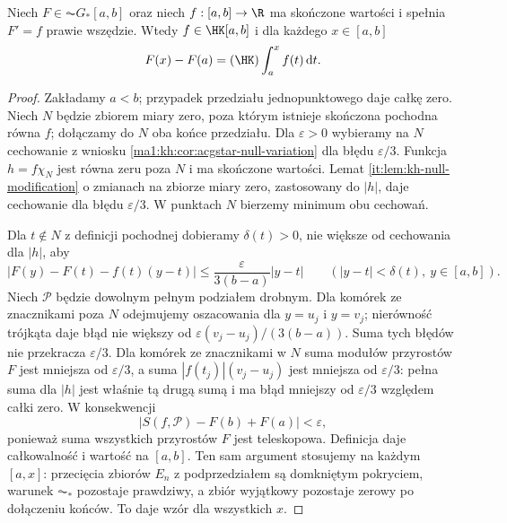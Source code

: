 \begin{twierdzenie}
\label{ma1:kh:thm:acgstar-derivative-integrable}\label{it:thm:acgstar-derivative-integrable}
Niech $F\in\AC G_*[a,b]$ oraz niech $f:[a,b]\to\R$ ma skończone wartości i spełnia $F'=f$ prawie wszędzie. Wtedy $f\in\HK[a,b]$ i dla każdego $x\in[a,b]$
\[
 F(x)-F(a)=(\HK)\int_a^x f(t)\,\mathrm dt.
\]
\end{twierdzenie}
\begin{proof}
Zakładamy $a<b$; przypadek przedziału jednopunktowego daje całkę zero. Niech $N$ będzie zbiorem miary zero, poza którym istnieje skończona pochodna równa $f$; dołączamy do $N$ oba końce przedziału. Dla $\varepsilon>0$ wybieramy na $N$ cechowanie z wniosku \ref{ma1:kh:cor:acgstar-null-variation} dla błędu $\varepsilon/3$. Funkcja $h=f\chi_N$ jest równa zeru poza $N$ i ma skończone wartości. Lemat \ref{it:lem:kh-null-modification} o zmianach na zbiorze miary zero, zastosowany do $|h|$, daje cechowanie dla błędu $\varepsilon/3$. W punktach $N$ bierzemy minimum obu cechowań.

Dla $t\notin N$ z definicji pochodnej dobieramy $\delta(t)>0$, nie większe od cechowania dla $|h|$, aby
\[
 |F(y)-F(t)-f(t)(y-t)|\le
 \frac{\varepsilon}{3(b-a)}|y-t|
 \qquad (|y-t|<\delta(t),\ y\in[a,b]).
\]
Niech $\mathcal P$ będzie dowolnym pełnym podziałem drobnym. Dla komórek ze znacznikami poza $N$ odejmujemy oszacowania dla $y=u_j$ i $y=v_j$; nierówność trójkąta daje błąd nie większy od $\varepsilon(v_j-u_j)/(3(b-a))$. Suma tych błędów nie przekracza $\varepsilon/3$. Dla komórek ze znacznikami w $N$ suma modułów przyrostów $F$ jest mniejsza od $\varepsilon/3$, a suma $|f(t_j)|(v_j-u_j)$ jest mniejsza od $\varepsilon/3$: pełna suma dla $|h|$ jest właśnie tą drugą sumą i ma błąd mniejszy od $\varepsilon/3$ względem całki zero. W konsekwencji
\[
 |S(f,\mathcal P)-F(b)+F(a)|<\varepsilon,
\]
ponieważ suma wszystkich przyrostów $F$ jest teleskopowa. Definicja daje całkowalność i wartość na $[a,b]$. Ten sam argument stosujemy na każdym $[a,x]$: przecięcia zbiorów $E_n$ z podprzedziałem są domkniętym pokryciem, warunek $\AC_*$ pozostaje prawdziwy, a zbiór wyjątkowy pozostaje zerowy po dołączeniu końców. To daje wzór dla wszystkich $x$.
\end{proof}

